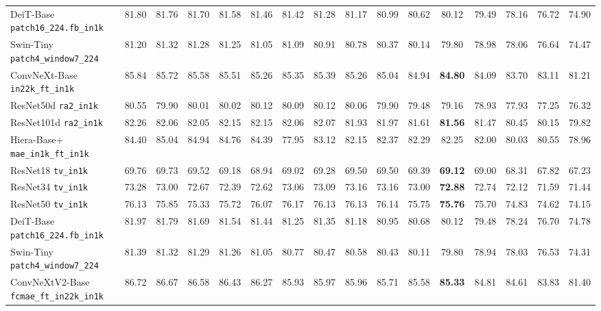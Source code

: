 \documentclass[11pt]{article}
\theoremstyle{plain}
\theoremstyle{definition}
\theoremstyle{remark}
\newcommand{\1}{\mathbf{1}}
\begin{document}
\begin{table}[!htbp]
\begin{tabular}{lccccccccccccccc}
DeiT-Base \texttt{patch16\_224.fb\_in1k}   & 81.80 & 81.76 & 81.70 & 81.58 & 81.46 & 81.42 & 81.28 & 81.17 & 80.99 & 80.62 & 80.12 & 79.49 & 78.16 & 76.72 & 74.90 \\
Swin-Tiny \texttt{patch4\_window7\_224}    & 81.20 & 81.32 & 81.28 & 81.25 & 81.05 & 81.09 & 80.91 & 80.78 & 80.37 & 80.14 & 79.80 & 78.98 & 78.06 & 76.64 & 74.47 \\
ConvNeXt-Base \texttt{in22k\_ft\_in1k}     & 85.84 & 85.72 & 85.58 & 85.51 & 85.26 & 85.35 & 85.39 & 85.26 & 85.04 & 84.94 & \textbf{84.80} & 84.09 & 83.70 & 83.11 & 81.21 \\
ResNet50d \texttt{ra2\_in1k}               & 80.55 & 79.90 & 80.01 & 80.02 & 80.12 & 80.09 & 80.12 & 80.06 & 79.90 & 79.48 & 79.16 & 78.93 & 77.93 & 77.25 & 76.32 \\
ResNet101d \texttt{ra2\_in1k}              & 82.26 & 82.06 & 82.05 & 82.15 & 82.15 & 82.06 & 82.07 & 81.93 & 81.97 & 81.61 & \textbf{81.56} & 81.47 & 80.45 & 80.15 & 79.82 \\
Hiera-Base+ \texttt{mae\_in1k\_ft\_in1k}   & 84.40 & 85.04 & 84.94 & 84.76 & 84.39 & 77.95 & 83.12 & 82.15 & 82.37 & 82.29 & 82.25 & 82.00 & 80.03 & 80.55 & 78.96 \\
ResNet18 \texttt{tv\_in1k}    & 69.76 & 69.73 & 69.52 & 69.18 & 68.94 & 69.02 & 69.28 & 69.50 & 69.50 & 69.39 & \textbf{69.12} & 69.00 & 68.31 & 67.82 & 67.23 \\
ResNet34 \texttt{tv\_in1k}    & 73.28 & 73.00 & 72.67 & 72.39 & 72.62 & 73.06 & 73.09 & 73.16 & 73.16 & 73.00 & \textbf{72.88} & 72.74 & 72.12 & 71.59 & 71.44 \\
ResNet50 \texttt{tv\_in1k}    & 76.13 & 75.85 & 75.33 & 75.72 & 76.07 & 76.17 & 76.13 & 76.13 & 76.14 & 75.75 & \textbf{75.76} & 75.70 & 74.83 & 74.62 & 74.15 \\
DeiT-Base \texttt{patch16\_224.fb\_in1k} & 81.97 & 81.79 & 81.69 & 81.54 & 81.44 & 81.25 & 81.35 & 81.18 & 80.95 & 80.68 & 80.12 & 79.48 & 78.24 & 76.70 & 74.78 \\
Swin-Tiny \texttt{patch4\_window7\_224} & 81.39 & 81.32 & 81.29 & 81.26 & 81.05 & 80.77 & 80.47 & 80.58 & 80.43 & 80.11 & 79.80 & 78.94 & 78.03 & 76.53 & 74.31 \\
ConvNeXtV2-Base \texttt{fcmae\_ft\_in22k\_in1k} & 86.72 & 86.67 & 86.58 & 86.43 & 86.27 & 85.93 & 85.97 & 85.96 & 85.71 & 85.58 & \textbf{85.33} & 84.81 & 84.61 & 83.83 & 81.40 \\
\bottomrule
\end{tabular}
\end{table}
\end{document}
